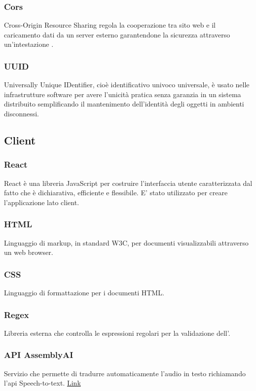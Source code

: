 \subsubsection{Cors}
Cross-Origin Resource Sharing regola la cooperazione tra sito web e il caricamento dati da un server esterno garantendone la sicurezza attraverso un'intestazione .
\subsubsection{UUID}
Universally Unique IDentifier, cioè identificativo univoco universale, è usato nelle infrastrutture software per avere l'unicità pratica senza garanzia in un sistema distribuito semplificando il mantenimento dell'identità degli oggetti in ambienti disconnessi.
\subsection{Client}
\subsubsection{React}
React è una libreria JavaScript per costruire l'interfaccia utente caratterizzata dal fatto che è dichiarativa, efficiente e flessibile. E' stato utilizzato per creare l'applicazione lato client.
\subsubsection{HTML}
Linguaggio di markup, in standard W3C, per documenti visualizzabili attraverso un web browser.
\subsubsection{CSS}
Linguaggio di formattazione per i documenti HTML.
\subsubsection{Regex}
Libreria esterna che controlla le espressioni regolari per la validazione dell'.
\subsubsection{API AssemblyAI}
Servizio che permette di tradurre automaticamente l'audio in testo richiamando l'api Speech-to-text. \href{https://www.assemblyai.com/blog/the-top-free-speech-to-text-apis-and-open-source-engines/}{\color{blue} Link}
\newpage